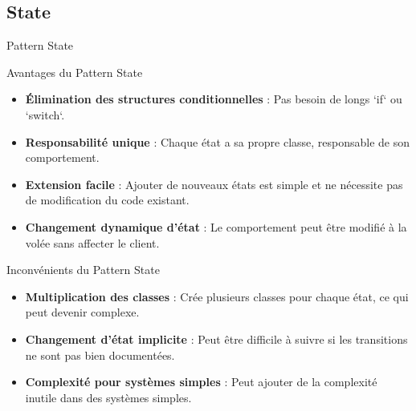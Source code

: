 \documentclass[aspectratio=169]{beamer}
\begin{document}
  \subsection{State}
  \begin{frame}{Pattern State}
  \end{frame}

  \begin{frame}{Avantages du Pattern State}
    \begin{itemize}
        \item \textbf{Élimination des structures conditionnelles} : Pas besoin de longs `if` ou `switch`.
        \item \textbf{Responsabilité unique} : Chaque état a sa propre classe, responsable de son comportement.
        \item \textbf{Extension facile} : Ajouter de nouveaux états est simple et ne nécessite pas de modification du code existant.
        \item \textbf{Changement dynamique d'état} : Le comportement peut être modifié à la volée sans affecter le client.
    \end{itemize}
  \end{frame}

  \begin{frame}{Inconvénients du Pattern State}
    \begin{itemize}
        \item \textbf{Multiplication des classes} : Crée plusieurs classes pour chaque état, ce qui peut devenir complexe.
        \item \textbf{Changement d'état implicite} : Peut être difficile à suivre si les transitions ne sont pas bien documentées.
        \item \textbf{Complexité pour systèmes simples} : Peut ajouter de la complexité inutile dans des systèmes simples.
    \end{itemize}
  \end{frame}
\end{document}
